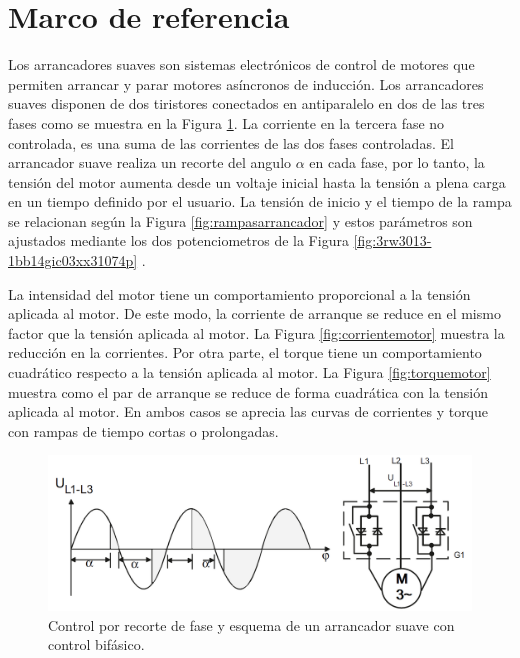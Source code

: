 \section{Marco de referencia}


Los arrancadores suaves son sistemas electrónicos de control de motores que permiten arrancar y parar motores asíncronos de inducción. Los arrancadores suaves disponen de dos tiristores conectados en antiparalelo en dos de las tres fases como se muestra en la Figura \ref{fig:controlfase}. La corriente en la tercera fase no controlada, es una suma de las corrientes de las dos fases controladas. El arrancador suave realiza un recorte del angulo $\alpha$ en cada fase, por lo tanto, la tensión del motor aumenta desde un voltaje inicial hasta la tensión a plena carga en un tiempo definido por el usuario. La tensión de inicio y el tiempo de la rampa se relacionan según la Figura \ref{fig:rampasarrancador} y estos parámetros son ajustados mediante los dos potenciometros de la Figura \ref{fig:3rw3013-1bb14gic03xx31074p} .

La intensidad del motor tiene un comportamiento proporcional a la tensión aplicada al motor. De este modo, la corriente de arranque se reduce en el mismo factor que la tensión aplicada al motor. La Figura \ref{fig:corrientemotor} muestra la reducción en la corrientes. Por otra parte, el torque tiene un comportamiento cuadrático respecto a la tensión aplicada al motor. La Figura \ref{fig:torquemotor} muestra como el par de arranque se reduce de forma cuadrática con la tensión aplicada al motor. En ambos casos se aprecia las curvas de corrientes y torque con rampas de tiempo cortas o prolongadas.

\begin{figure}
	\centering
	\includegraphics[width=0.75\linewidth]{fig/ControlFase}
	\caption{Control por recorte de fase y esquema de un arrancador suave con control bifásico. \cite{SIEMENS}}
	\label{fig:controlfase}
\end{figure}



